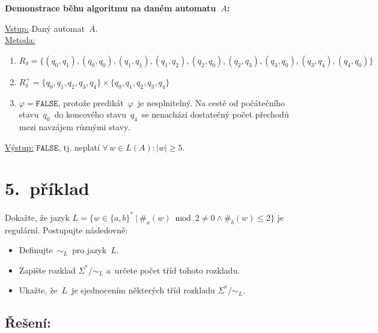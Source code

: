 \documentclass[a4paper, 11pt]{scrartcl}
\begin{document}
    \textbf{Demonstrace běhu algoritmu na daném automatu~$ A $:}
    \begin{addmargin}[10pt]{0pt}
        \underline{Vstup:}
            Daný automat~$ A $.
        \\[5pt]
        \underline{Metoda:}
            \begin{enumerate}
                \item
                    $ R_\delta = \{(q_0, q_1), (q_0, q_0), (q_1, q_1),
                    (q_1, q_2), (q_2, q_0), (q_2, q_3), (q_3, q_0),
                    (q_3, q_4), (q_4, q_0)\} $

                \item
                    $ R_\delta^+ = \{q_0, q_1, q_2, q_3, q_4\} \times
                    \{q_0, q_1, q_2, q_3, q_4\}$

                \item
                    $ \varphi = \mathtt{FALSE} $, protože
                    predikát~$ \varphi $~je nesplnitelný. Na cestě od
                    počátečního stavu~$ q_0 $~do koncového
                    stavu~$ q_4 $~se nenachází dostatečný počet přechodů
                    mezi navzájem různými stavy.
            \end{enumerate}
        \underline{Výstup:}
            $ \mathtt{FALSE} $, tj. neplatí $ \forall\,w \in L(A):
            |w| \geq 5$.
    \end{addmargin}


    \section*{5.~příklad}

    Dokažte, že jazyk $ L =\{w \in \{a, b\}^*\ |\ \#_a(w) \bmod 2 \neq 0
    \wedge \#_b(w) \leq 2\} $ je regulární. Postupujte následovně:
    \begin{itemize}
        \item
            Definujte~$ \sim_L $~pro jazyk~$ L $.

        \item
            Zapište rozklad $ \Sigma^* / \sim_L $ a~určete počet tříd
            tohoto rozkladu.

        \item
            Ukažte, že~$ L $~je sjednocením některých tříd rozkladu
            $ \Sigma^* / \sim_L $.
    \end{itemize}

    \subsection*{Řešení:}
\end{document}
